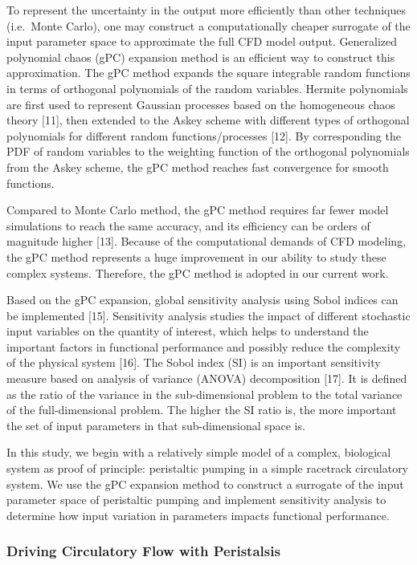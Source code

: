 \documentclass[
]{article}
\begin{document}
To represent the uncertainty in the output more efficiently than other
techniques (i.e.~Monte Carlo), one may construct a computationally
cheaper surrogate of the input parameter space to approximate the full
CFD model output. Generalized polynomial chaos (gPC) expansion method is
an efficient way to construct this approximation. The gPC method expands
the square integrable random functions in terms of orthogonal
polynomials of the random variables. Hermite polynomials are first used
to represent Gaussian processes based on the homogeneous chaos theory
{[}11{]}, then extended to the Askey scheme with different types of
orthogonal polynomials for different random functions/processes
{[}12{]}. By corresponding the PDF of random variables to the weighting
function of the orthogonal polynomials from the Askey scheme, the gPC
method reaches fast convergence for smooth functions.

Compared to Monte Carlo method, the gPC method requires far fewer model
simulations to reach the same accuracy, and its efficiency can be orders
of magnitude higher {[}13{]}. Because of the computational demands of
CFD modeling, the gPC method represents a huge improvement in our
ability to study these complex systems. Therefore, the gPC method is
adopted in our current work.

Based on the gPC expansion, global sensitivity analysis using Sobol
indices can be implemented {[}15{]}. Sensitivity analysis studies the
impact of different stochastic input variables on the quantity of
interest, which helps to understand the important factors in functional
performance and possibly reduce the complexity of the physical system
{[}16{]}. The Sobol index (SI) is an important sensitivity measure based
on analysis of variance (ANOVA) decomposition {[}17{]}. It is defined as
the ratio of the variance in the sub-dimensional problem to the total
variance of the full-dimensional problem. The higher the SI ratio is,
the more important the set of input parameters in that sub-dimensional
space is.

In this study, we begin with a relatively simple model of a complex,
biological system as proof of principle: peristaltic pumping in a simple
racetrack circulatory system. We use the gPC expansion method to
construct a surrogate of the input parameter space of peristaltic
pumping and implement sensitivity analysis to determine how input
variation in parameters impacts functional performance.

\hypertarget{driving-circulatory-flow-with-peristalsis}{%
\subsubsection{Driving Circulatory Flow with
Peristalsis}\label{driving-circulatory-flow-with-peristalsis}}
\end{document}
